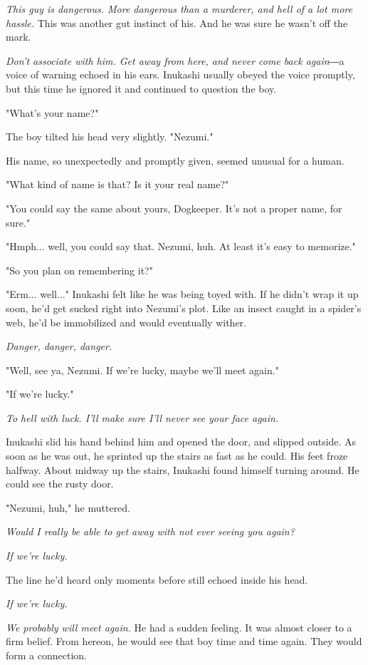 \emph{This guy is dangerous. More dangerous than a murderer, and hell of a lot
more hassle.} This was another gut instinct of his. And he was sure he
wasn't off the mark.

\emph{Don't associate with him. Get away from here, and never come back
again}―a voice of warning echoed in his ears. Inukashi usually obeyed the
voice promptly, but this time he ignored it and continued to question
the boy.

"What's your name?"

The boy tilted his head very slightly. "Nezumi."

His name, so unexpectedly and promptly given, seemed unusual for a
human.

"What kind of name is that? Is it your real name?"

"You could say the same about yours, Dogkeeper. It's not a proper name,
for sure."

"Hmph... well, you could say that. Nezumi, huh. At least it's easy to
memorize."

"So you plan on remembering it?"

"Erm... well..." Inukashi felt like he was being toyed with. If he
didn't wrap it up soon, he'd get sucked right into Nezumi's plot. Like
an insect caught in a spider's web, he'd be immobilized and would
eventually wither.

\emph{Danger, danger, danger.}

"Well, see ya, Nezumi. If we're lucky, maybe we'll meet again."

"If we're lucky."

\emph{To hell with luck. I'll make sure I'll never see your face again.}

Inukashi slid his hand behind him and opened the door, and slipped
outside. As soon as he was out, he sprinted up the stairs as fast as he
could. His feet froze halfway. About midway up the stairs, Inukashi
found himself turning around. He could see the rusty door.

"Nezumi, huh," he muttered.

\emph{Would I really be able to get away with not ever seeing you again?}

\emph{If we're lucky.}

The line he'd heard only moments before still echoed inside his head.

\emph{If we're lucky.}

\emph{We probably will meet again.} He had a sudden feeling. It was almost
closer to a firm belief. From hereon, he would see that boy time and
time again. They would form a connection.

